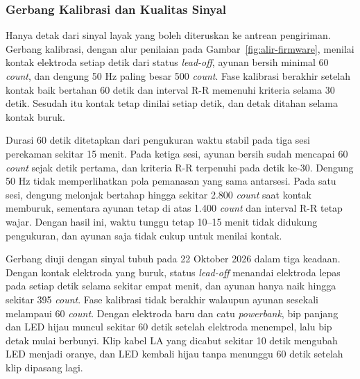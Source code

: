 \subsubsection{Gerbang Kalibrasi dan Kualitas Sinyal}

Hanya detak dari sinyal layak yang boleh diteruskan ke antrean pengiriman. Gerbang kalibrasi, dengan alur penilaian pada Gambar~\ref{fig:alir-firmware}, menilai kontak elektroda setiap detik dari status \textit{lead-off}, ayunan bersih minimal 60 \textit{count}, dan dengung 50 Hz paling besar 500 \textit{count}. Fase kalibrasi berakhir setelah kontak baik bertahan 60 detik dan interval R-R memenuhi kriteria selama 30 detik. Sesudah itu kontak tetap dinilai setiap detik, dan detak ditahan selama kontak buruk.

Durasi 60 detik ditetapkan dari pengukuran waktu stabil pada tiga sesi perekaman sekitar 15 menit. Pada ketiga sesi, ayunan bersih sudah mencapai 60 \textit{count} sejak detik pertama, dan kriteria R-R terpenuhi pada detik ke-30. Dengung 50 Hz tidak memperlihatkan pola pemanasan yang sama antarsesi. Pada satu sesi, dengung melonjak bertahap hingga sekitar 2.800 \textit{count} saat kontak memburuk, sementara ayunan tetap di atas 1.400 \textit{count} dan interval R-R tetap wajar. Dengan hasil ini, waktu tunggu tetap 10--15 menit tidak didukung pengukuran, dan ayunan saja tidak cukup untuk menilai kontak.

Gerbang diuji dengan sinyal tubuh pada 22 Oktober 2026 dalam tiga keadaan. Dengan kontak elektroda yang buruk, status \textit{lead-off} menandai elektroda lepas pada setiap detik selama sekitar empat menit, dan ayunan hanya naik hingga sekitar 395 \textit{count}. Fase kalibrasi tidak berakhir walaupun ayunan sesekali melampaui 60 \textit{count}. Dengan elektroda baru dan catu \textit{powerbank}, bip panjang dan LED hijau muncul sekitar 60 detik setelah elektroda menempel, lalu bip detak mulai berbunyi. Klip kabel LA yang dicabut sekitar 10 detik mengubah LED menjadi oranye, dan LED kembali hijau tanpa menunggu 60 detik setelah klip dipasang lagi.

